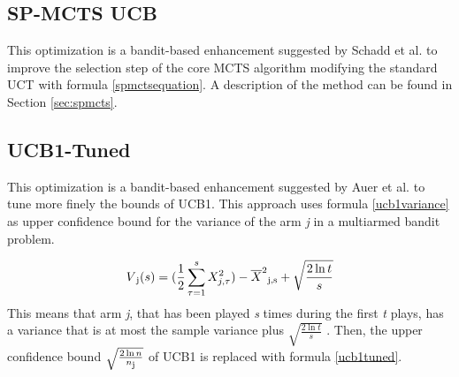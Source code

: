 \subsection{SP-MCTS UCB}
This optimization is a bandit-based enhancement suggested by Schadd et al. \cite{DBLP:journals/kbs/SchaddWTU12} to improve the selection step of the core MCTS algorithm modifying the standard UCT with formula \ref{spmctsequation}. A description of the method can be found in Section \ref{sec:spmcts}.

\subsection{UCB1-Tuned}
This optimization is a bandit-based enhancement suggested by Auer et al. \cite{Auer2002} to tune more finely the bounds of UCB1. This approach uses formula \ref{ucb1variance} as upper confidence bound for the variance of the arm \textit{j} in a multiarmed bandit problem.

\begin{equation}\label{ucb1variance}
    V\textsubscript{j}(s) = (\frac{1}{2}\sum\limits_{\tau=1}^{s} {X^{2}_{j,\tau}}) - \overline{X}^{2}\textsubscript{j,s} + \sqrt{\frac{2\ln{t}}{s}}
\end{equation}
This means that arm \textit{j}, that has been played \textit{s} times during the first \textit{t} plays, has a variance that is at most the sample variance plus $\sqrt{\frac{2\ln{t}}{s}}$ \cite{Auer2002}. Then, the upper confidence bound $\sqrt{\frac{2\ln{n}}{n\textsubscript{j}}}$ of UCB1 is replaced with formula \ref{ucb1tuned}.

